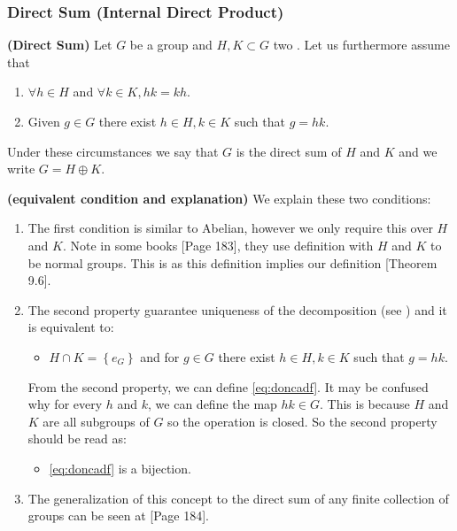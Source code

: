 \documentclass{article}
\newcommand{\bfs}[1]{\textbf{({#1}) }}
\begin{document}
\subsubsection{Direct Sum (Internal Direct Product) }
\begin{defa}{\bfs{Direct Sum}}\label{def:dir_sum}
 Let $G$ be a group and $H, K \subset G$ two . Let us furthermore assume that
\begin{enumerate}
    \item $\forall h \in H$ and $\forall k \in K, h k=k h .$
    \item Given $g \in G$ there exist  $h \in H, k \in K$ such that $g=h k$.
\end{enumerate}
Under these circumstances we say that $G$ is the direct sum of $H$ and $K$ and we write $G=H \oplus K$. 
\end{defa} 
\begin{rema}{\bfs{equivalent condition and explanation}}We explain these two conditions:
\begin{enumerate}
    \item     The first condition is similar to Abelian, however we only require this  over $H$ and $K$. Note in some books \cite{gallian2021contemporary}[Page 183], they use definition with $H$ and $K$ to be normal groups. This is  as this definition implies our definition \cite{gallian2021contemporary}[Theorem 9.6].
    \item The second property guarantee uniqueness of the decomposition (see \cite[page 2]{horn2012matrix}) and it is equivalent to:
\begin{itemize}
    \item  $H \cap K=\left\{e_{G}\right\}$ and for $g \in G$ there exist $h \in H, k \in K$ such that $g=h k$. 
\end{itemize}
From the second property, we can define  \cref{eq:doncadf}. It may be confused why for every $h$ and $k$, we can define the map $hk\in G$. This is because $H$ and $K$ are all subgroups of $G$ so the operation is closed. So the second property should be read as:
\begin{itemize}
    \item   \cref{eq:doncadf} is a bijection.
\end{itemize}
\item The generalization of this concept to the direct sum of any finite collection of groups can be seen at \cite{gallian2021contemporary}[Page 184].
\end{enumerate}

\end{rema}
\end{document}
